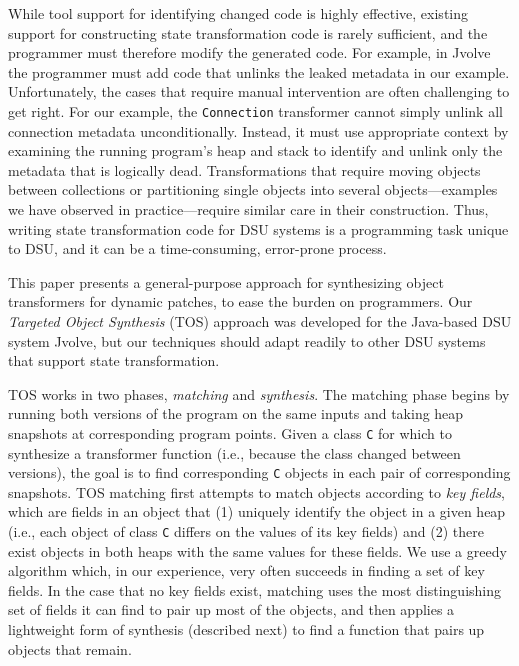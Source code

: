 \documentclass[natbib]{sigplanconf}
\newcommand{\code}[1]{\lstinline|#1|\xspace}
\newcommand{\TOS}{TOS\xspace}
\begin{document}
While tool support for identifying changed code is highly effective,
existing support for constructing state transformation code is rarely
sufficient, and the programmer must therefore modify the generated code.  
For example, in Jvolve the programmer must  add code that
unlinks the leaked metadata in our example.  Unfortunately, the cases
that require manual intervention are often challenging to get right.
For our example, the \code{Connection} transformer cannot simply unlink all
connection metadata unconditionally. Instead, it must use appropriate
context by examining the running program's heap and stack to
identify and unlink only the metadata that is logically dead.
Transformations that require moving objects between collections or
partitioning single objects into several objects---examples we have
observed in practice---require similar care in their construction.
Thus, writing state transformation code for DSU systems is a  programming task unique to DSU, and it can be
a time-consuming, error-prone process.

This paper presents a
general-purpose approach for synthesizing object transformers for
dynamic patches, to ease the burden on programmers.  Our \emph{Targeted Object
  Synthesis} (\TOS) approach was developed for the Java-based DSU system Jvolve, but
our techniques should adapt readily to other DSU systems that support state
transformation.


\TOS works in two phases, \emph{matching} and \emph{synthesis}.  The
matching phase begins by running both versions of the program on the
same inputs and taking heap snapshots at corresponding program points.
Given a class \code{C} for which to synthesize a transformer function
(i.e., because the class changed between versions), the goal is to
find corresponding \code{C} objects in each pair of corresponding
snapshots.  \TOS matching first attempts to match objects according to
\emph{key fields}, which are fields in an object that (1) uniquely
identify the object in a given heap (i.e., each object of class
\code{C} differs on the values of its key fields) and (2) there exist
objects in both heaps with the same values for these fields.  We use a
greedy algorithm which, in our experience, very often succeeds in
finding a set of key fields.  In the case that no key fields exist,
matching uses the most distinguishing set of fields it can find to
pair up most of the objects, and then applies a lightweight form of
synthesis (described next) to find a function that pairs up objects
that remain.
\end{document}
